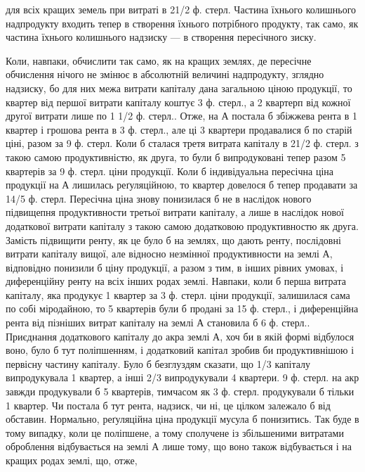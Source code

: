 \parcont{}  %
для всіх кращих земель при витраті в 21/2 ф. стерл. Частина їхнього колишнього
надпродукту входить тепер в створення їхнього потрібного продукту, так
само, як частина їхнього колишнього надзиску — в створення пересічного зиску.

Коли, навпаки, обчислити так само, як на кращих землях, де пересічне обчислення
нічого не змінює в абсолютній величині надпродукту, зглядно надзиску, бо для
них межа витрати капіталу дана загальною ціною продукції, то квартер від першої
витрати капіталу коштує 3 ф. стерл., а 2 квартерп від кожної другої витрати
лише по 1 1/2 ф. стерл.. Отже, на А постала б збіжжева рента в 1 квартер
і грошова рента в 3 ф. стерл., але ці 3 квартери продавалися б по старій
ціні, разом за 9 ф. стерл. Коли б сталася третя витрата капіталу в 21/2 ф.
стерл. з такою самою продуктивністю, як друга, то були б випродуковані тепер
разом 5 квартерів за 9 ф. стерл. ціни продукції. Коли б індивідуальна
пересічна ціна продукції на А лишилась реґуляційною, то квартер довелося б
тепер продавати за 14/5 ф. стерл. Пересічна ціна знову понизилася б не в
наслідок нового підвищепня продуктивности третьої витрати капіталу, а лише в
наслідок нової додаткової витрати капіталу з такою самою додатковою продуктивностю
як друга. Замість підвищити ренту, як це було б на землях, що дають
ренту, послідовні витрати капіталу вищої, але відносно незмінної продуктивности
на землі А, відповідно понизили б ціну продукції, а разом з тим, в інших
рівних умовах, і диференційну ренту на всіх інших родах землі. Навпаки,
коли б перша витрата капіталу, яка продукує 1 квартер за 3 ф. стерл. ціни
продукції, залишилася сама по собі міродайною, то 5 квартерів були б продані
за 15 ф. стерл., і диференційна рента від пізніших витрат капіталу на землі
А становила б 6 ф. стерл.. Приєднання додаткового капіталу до акра землі А,
хоч би в якій формі відбулося воно, було б тут поліпшенням, і додатковий
капітал зробив би продуктивнішою і первісну частину капіталу. Було б безглуздям
сказати, що 1/3 капіталу випродукувала 1 квартер, а інші 2/3 випродукували
4 квартери. 9 ф. стерл. на акр завжди продукували б 5 квартерів, тимчасом
як 3 ф. стерл. продукували б тільки 1 квартер. Чи постала б тут рента, надзиск,
чи ні, це цілком залежало б від обставин. Нормально, реґуляційна ціна
продукції мусула б понизитись. Так буде в тому випадку, коли це поліпшене,
а тому сполучене із збільшеними витратами оброблення відбувається на землі А
лише тому, що воно також відбувається і на кращих родах землі, що, отже,
